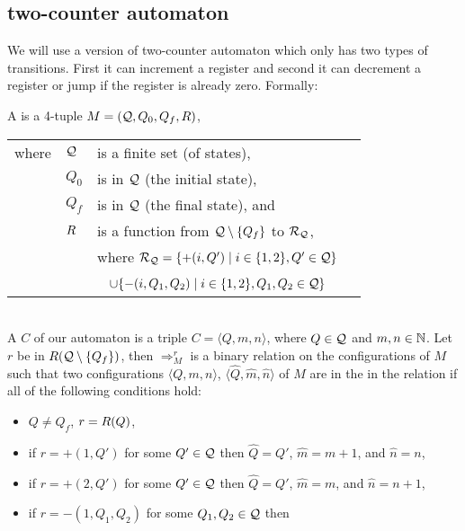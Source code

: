 \subsection{two-counter automaton} %
We will use a version of two-counter automaton which only has two types of transitions. First it can increment a register and second it can decrement a register or jump if the register is already zero. Formally:
\begin{definition}
	A  is a 4-tuple $M=(\mathcal{Q},Q_0,Q_f,R)$,
	\begin{tabular}{llp{0.78\linewidth}}
		where & $\mathcal{Q}$ & is a finite set (of states),                                                                           \\
& $Q_0$        & is in $\mathcal{Q}$ (the initial state),                                                                \\
& $Q_f$        & is in $\mathcal{Q}$ (the final state), and                                                              \\
& $R$  & is a function from $\mathcal{Q}\setminus\{Q_f\}$ to $\mathcal{R}_\autStates$,                           \\
&              & where $\mathcal{R}_{\mathcal{Q}}=\{+(i,Q')\mid i\in\{1,2\},Q'\in\mathcal{Q}\}$                             \\
&              & ~ \hphantom{where $\mathcal{R}_\autStates$}$\cup\{-(i,Q_1,Q_2)\mid i\in\{1,2\},Q_1,Q_2\in\mathcal{Q}\}$ 
	\end{tabular}\\
	A  $C$ of our automaton is a triple $C=\langle Q,m,n\rangle$, where $Q\in\mathcal{Q}$ and $m,n\in\mathbb{N}$.
	Let $r$ be in $R(\mathcal{Q}\setminus\{Q_f\})$, then $\Rightarrow^r_M$ is a binary relation on the configurations of $M$ such that two configurations $\langle Q,m,n\rangle$, $\langle \widehat{Q},\widehat{m},\widehat{n}\rangle$ of $M$ are in the in the relation if all of the following conditions hold:
	\begin{itemize}
		\item $Q\neq Q_f$, $r=R(Q)$,
		\item if $r=+(1,Q')$ for some $Q'\in \mathcal{Q}$ then $\widehat{Q}=Q'$, $\widehat{m}=m+1$, and $\widehat{n}=n$,
		\item if $r=+(2,Q')$ for some $Q'\in \mathcal{Q}$ then $\widehat{Q}=Q'$, $\widehat{m}=m$, and $\widehat{n}=n+1$,
		\item if $r=-(1,Q_1,Q_2)$ for some $Q_1,Q_2\in \mathcal{Q}$ then

\end{itemize}
\end{definition}
